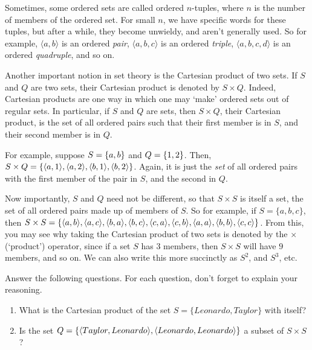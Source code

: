 Sometimes, some ordered sets are called ordered $n$-tuples, where $n$ is the number of members of the ordered set. For small $n$, we have specific words for these tuples, but after a while, they become unwieldy, and aren't generally used. So for example, $\langle a, b \rangle$ is an ordered \textit{pair}, $\langle a, b, c \rangle$ is an ordered \textit{triple}, $\langle a, b, c, d \rangle$ is an ordered \textit{quadruple}, and so on. 

Another important notion in set theory is the Cartesian product of two sets. If $S$ and $Q$ are two sets, their Cartesian product is denoted by $S \times Q$. Indeed, Cartesian products are one way in which one may `make' ordered sets out of regular sets. In particular, if $S$ and $Q$ are sets, then $S \times Q$, their Cartesian product, is the set of all ordered pairs such that their first member is in $S$, and their second member is in $Q$. 

For example, suppose $S=\{a, b\}$ and $Q=\{1, 2\}$. Then, $S \times Q=\{\langle a, 1\rangle, \langle a, 2\rangle, \langle b, 1\rangle, \langle b, 2\rangle\}$. Again, it is just the \textit{set} of all ordered pairs with the first member of the pair in $S$, and the second in $Q$. 

Now importantly, $S$ and $Q$ need not be different, so that $S\times S$ is itself a set, the set of all ordered pairs made up of members of $S$. So for example, if $S=\{a, b, c\}$, then $S \times S=\{\langle a, b\rangle, \langle a, c\rangle, \langle b, a\rangle, \langle b, c\rangle, \langle c, a\rangle, \langle c, b\rangle, \langle a, a\rangle, \langle b,b\rangle, \langle c,c\rangle\}$. From this, you may see why taking the Cartesian product of two sets is denoted by the $\times$ (`product') operator, since if a set $S$ has $3$ members, then $S \times S$ will have $9$ members, and so on. We can also write this more succinctly as $S^2$, and $S^3$, etc. 


\begin{exc}

Answer the following questions. For each question, don't forget to explain your reasoning. 	

	\begin{enumerate}
		\item What is the Cartesian product of the set $S=\{Leonardo, Taylor\}$ with itself?
		\item Is the set $Q=\{\langle Taylor, Leonardo\rangle, \langle Leonardo, Leonardo\rangle\}$ a subset of $S \times S$?
	\end{enumerate} 
\end{exc}

